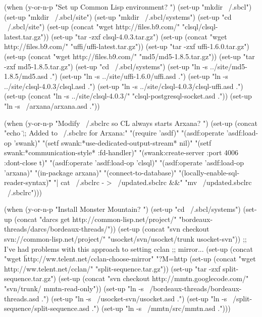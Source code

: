 \begin{elisp}
  (when (y-or-n-p "Set up Common Lisp environment? ")
    (set-up "mkdir ~/.sbcl")
    (set-up "mkdir ~/.sbcl/site")
    (set-up "mkdir ~/.sbcl/systems")
    (set-up "cd ~/.sbcl/site")
    (set-up (concat "wget http://files.b9.com/"
                    "clsql/clsql-latest.tar.gz"))
    (set-up "tar -zxf clsql-4.0.3.tar.gz")
    (set-up (concat "wget http://files.b9.com/"
                           "uffi/uffi-latest.tar.gz"))
    (set-up "tar -zxf uffi-1.6.0.tar.gz")
    (set-up (concat "wget http://files.b9.com/"
                           "md5/md5-1.8.5.tar.gz"))
    (set-up "tar -zxf md5-1.8.5.tar.gz")
    (set-up "cd ~/.sbcl/systems")
    (set-up "ln -s ../site/md5-1.8.5/md5.asd .")
    (set-up "ln -s ../site/uffi-1.6.0/uffi.asd .")
    (set-up "ln -s ../site/clsql-4.0.3/clsql.asd .")
    (set-up "ln -s ../site/clsql-4.0.3/clsql-uffi.asd .")
    (set-up (concat "ln -s ../site/clsql-4.0.3/"
                           "clsql-postgresql-socket.asd ."))
    (set-up "ln -s ~/arxana/arxana.asd ."))

  (when (y-or-n-p "Modify ~/.sbclrc so CL always starts Arxana? ")
    (set-up
     (concat "echo \";; Added to ~/.sbclrc for Arxana:\n\n"
             "(require 'asdf)\n\n"
             "(asdf:operate 'asdf:load-op 'swank)\n"
             "(setf swank:*use-dedicated-output-stream* nil)\n"
             "(setf swank:*communication-style* :fd-handler)\n"
             "(swank:create-server :port 4006 :dont-close t)\n\n"
             "(asdf:operate 'asdf:load-op 'clsql)\n"
             "(asdf:operate 'asdf:load-op 'arxana)\n"
             "(in-package arxana)\n"
             "(connect-to-database)\n"
             "(locally-enable-sql-reader-syntax)\n\n\""
             "| cat ~/.sbclrc - > ~/updated.sbclrc &&"
             "mv ~/updated.sbclrc ~/.sbclrc")))

  (when (y-or-n-p "Install Monster Mountain? ")
    (set-up "cd ~/.sbcl/systems")
    (set-up (concat
                    "darcs get http://common-lisp.net/project/"
                    "bordeaux-threads/darcs/bordeaux-threads/"))
    (set-up (concat
                    "svn checkout svn://common-lisp.net/project/"
                    "usocket/svn/usocket/trunk usocket-svn"))
    ;; I've had problems with this approach to setting cclan
    ;; mirror...
    (set-up
     (concat
      "wget \"http://ww.telent.net/cclan-choose-mirror"
      "?M=http%
    (set-up (concat "wget http://ww.telent.net/cclan/"
                           "split-sequence.tar.gz"))
    (set-up "tar -zxf split-sequence.tar.gz")
    (set-up
     (concat "svn checkout http://mmtn.googlecode.com/"
             "svn/trunk/ mmtn-read-only"))
    (set-up
     "ln -s ~/bordeaux-threads/bordeaux-threads.asd .")
    (set-up "ln -s ~/usocket-svn/usocket.asd .")
    (set-up "ln -s ~/split-sequence/split-sequence.asd .")
    (set-up "ln -s ~/mmtn/src/mmtn.asd .")))
\end{elisp}


